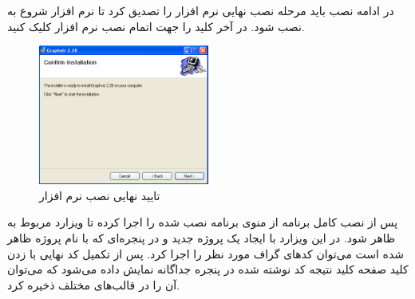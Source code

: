 در ادامه نصب باید مرحله نصب نهایی نرم افزار را تصدیق کرد تا نرم افزار شروع به
نصب شود. در آخر کلید  را جهت اتمام نصب نرم افزار کلیک کنید.
\begin{figure}
	\centering
	\includegraphics[width=0.5\textwidth]{image/write/graph/graphviz/install-3}
	\caption[تایید نهایی نصب نرم افزار]{
		تایید نهایی نصب نرم افزار
	}
	\label{image/write/graph/graphviz/install-3}
\end{figure}

پس از نصب کامل برنامه از منوی  برنامه نصب شده  را اجرا
کرده تا ویزارد مربوط به  ظاهر شود. در این ویزارد با ایجاد یک پروژه
جدید و در پنجره‌ای که با نام پروژه ظاهر شده است می‌توان کدهای گراف مورد نظر را
اجرا کرد. پس از تکمیل کد نهایی با زدن کلید  صفحه کلید نتیجه کد نوشته شده
در پنجره جداگانه نمایش داده می‌شود که می‌توان آن را در قالب‌های مختلف ذخیره کرد.



